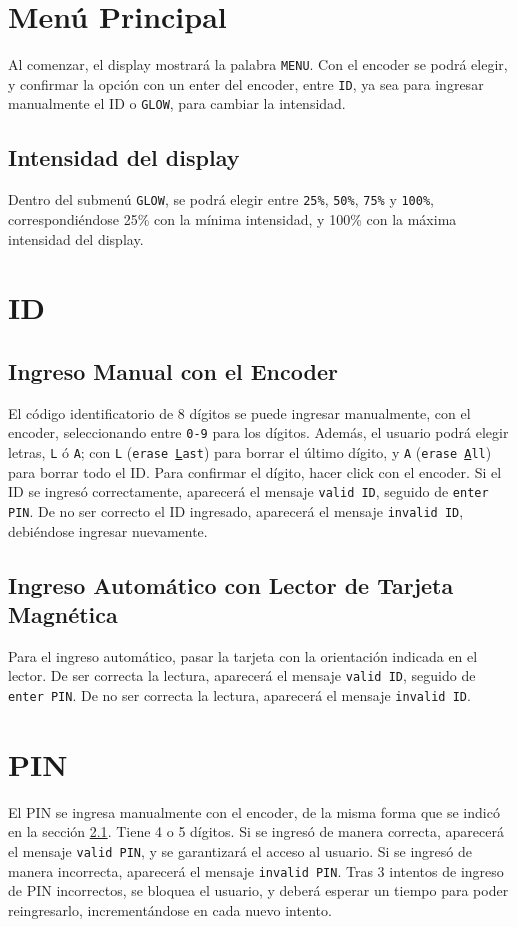 \section{Menú Principal}

Al comenzar, el display mostrará la palabra \texttt{MENU}. 
Con el encoder se podrá elegir, y confirmar la opción con un enter del encoder, entre \texttt{ID}, 
ya sea para ingresar manualmente el ID o \texttt{GLOW}, para cambiar la intensidad.

\subsection{Intensidad del display}

Dentro del submenú \texttt{GLOW}, se podrá elegir entre \texttt{25\%}, \texttt{50\%}, \texttt{75\%} y \texttt{100\%}, 
correspondiéndose 25\% con la mínima intensidad, y 100\% con la máxima intensidad del display.

\section{ID}
\subsection{Ingreso Manual con el Encoder}
\label{pinsection}
El código identificatorio de 8 dígitos se puede ingresar manualmente, con el encoder, 
seleccionando entre \texttt{0-9} para los dígitos. Además, el usuario podrá elegir letras,
 \texttt{L} ó \texttt{A}; con \texttt{L} (\texttt{erase \underline{L}ast}) para borrar el último dígito, 
 y \texttt{A} (\texttt{erase \underline{A}ll}) para borrar todo el ID.
 Para confirmar el dígito, hacer click con el encoder.
 Si el ID se ingresó correctamente, aparecerá el mensaje \texttt{valid ID}, seguido de \texttt{enter PIN}.
 De no ser correcto el ID ingresado, aparecerá el mensaje \texttt{invalid ID}, debiéndose ingresar nuevamente.

 \subsection{Ingreso Automático con Lector de Tarjeta Magnética}
 Para el ingreso automático, pasar la tarjeta con la orientación indicada en el lector.
 De ser correcta la lectura, aparecerá el mensaje \texttt{valid ID}, seguido de \texttt{enter PIN}.
 De no ser correcta la lectura, aparecerá el mensaje \texttt{invalid ID}.

 \section{PIN}
 El PIN se ingresa manualmente con el encoder, de la misma forma 
 que se indicó en la sección \ref{pinsection}. Tiene 4 o 5 dígitos.
 Si se ingresó de manera correcta, aparecerá el mensaje \texttt{valid PIN}, 
 y se garantizará el acceso al usuario.
Si se ingresó de manera incorrecta, aparecerá el mensaje \texttt{invalid PIN}.
Tras 3 intentos de ingreso de PIN incorrectos, se bloquea el usuario, 
y deberá esperar un tiempo para poder reingresarlo, incrementándose en cada nuevo intento.

